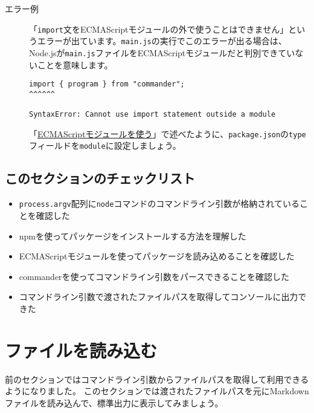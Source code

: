 \begin{description}
\item[エラー例] \label{syntax-error-import-statement}

「\texttt{import}文をECMAScriptモジュールの外で使うことはできません」というエラーが出ています。\texttt{main.js}の実行でこのエラーが出る場合は、Node.jsが\texttt{main.js}ファイルをECMAScriptモジュールだと判別できていないことを意味します。

\begin{lstlisting}
import { program } from "commander";
^^^^^^

SyntaxError: Cannot use import statement outside a module
\end{lstlisting}

「\hyperlink{esmodule}{ECMAScriptモジュールを使う}」で述べたように、\texttt{package.json}の\texttt{type}フィールドを\texttt{module}に設定しましょう。
\end{description}

\hypertarget{section-checklist}{%
\subsection{このセクションのチェックリスト}\label{section-checklist}}

\begin{itemize}
\item
  \texttt{process.argv}配列に\texttt{node}コマンドのコマンドライン引数が格納されていることを確認した
\item
  npmを使ってパッケージをインストールする方法を理解した
\item
  ECMAScriptモジュールを使ってパッケージを読み込めることを確認した
\item
  commanderを使ってコマンドライン引数をパースできることを確認した
\item
  コマンドライン引数で渡されたファイルパスを取得してコンソールに出力できた
\end{itemize}

\hypertarget{read-file}{%
\section{ファイルを読み込む}\label{read-file}}

\enlargethispage{\baselineskip}前のセクションではコマンドライン引数からファイルパスを取得して利用できるようになりました。
このセクションでは渡されたファイルパスを元にMarkdownファイルを読み込んで、標準出力に表示してみましょう。

